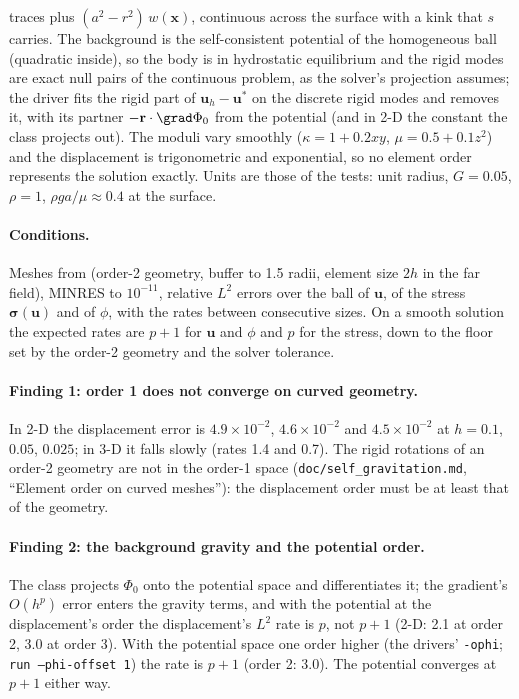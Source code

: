 \documentclass[11pt]{article}
\numberwithin{equation}{section}
\newcommand{\vu}{\mathbf{u}}
\newcommand{\vx}{\mathbf{x}}
\newcommand{\code}[1]{\texttt{#1}}
\newcommand{\bsig}{\bm{\sigma}}
\begin{document}
traces plus $(a^2-r^2)\,w(\vx)$, continuous across the surface with a kink
that $s$ carries. The background is the self-consistent potential of the
homogeneous ball (quadratic inside), so the body is in hydrostatic
equilibrium and the rigid modes are exact null pairs of the continuous
problem, as the solver's projection assumes; the driver fits the rigid part
of $\vu_h-\vu^*$ on the discrete rigid modes and removes it, with its
partner $-\mathbf{r}\cdot\grad\Phi_0$ from the potential (and in 2-D the
constant the class projects out). The moduli vary smoothly
($\kappa = 1+0.2xy$, $\mu = 0.5+0.1z^2$) and the displacement is
trigonometric and exponential, so no element order represents the solution
exactly. Units are those of the tests: unit radius, $G=0.05$, $\rho=1$,
$\rho g a/\mu\approx0.4$ at the surface.

\paragraph{Conditions.} Meshes from 
(order-2 geometry, buffer to 1.5 radii, element size $2h$ in the far
field), MINRES to $10^{-11}$, relative $L^2$ errors over the ball of $\vu$,
of the stress $\bsig(\vu)$ and of $\phi$, with the rates between
consecutive sizes. On a smooth solution the
expected rates are $p+1$ for $\vu$ and $\phi$ and $p$ for the stress, down
to the floor set by the order-2 geometry and the solver tolerance.

\paragraph{Finding 1: order 1 does not converge on curved geometry.} In
2-D the displacement error is $4.9\times10^{-2}$, $4.6\times10^{-2}$ and
$4.5\times10^{-2}$ at $h=0.1$, $0.05$, $0.025$; in 3-D it falls slowly
(rates 1.4 and 0.7). The rigid rotations of an order-2 geometry are not in
the order-1 space (\code{doc/self\_gravitation.md}, ``Element order on
curved meshes''): the displacement order must be at least that of the
geometry.

\paragraph{Finding 2: the background gravity and the potential order.} The
class projects $\Phi_0$ onto the potential space and differentiates it; the
gradient's $O(h^p)$ error enters the gravity terms, and with the potential
at the displacement's order the displacement's $L^2$ rate is $p$, not
$p+1$ (2-D: 2.1 at order 2, 3.0 at order 3). With the potential space one
order higher (the drivers' \code{-ophi}; \code{run --phi-offset 1}) the
rate is $p+1$ (order 2: 3.0). The potential converges at $p+1$ either way.
\end{document}
